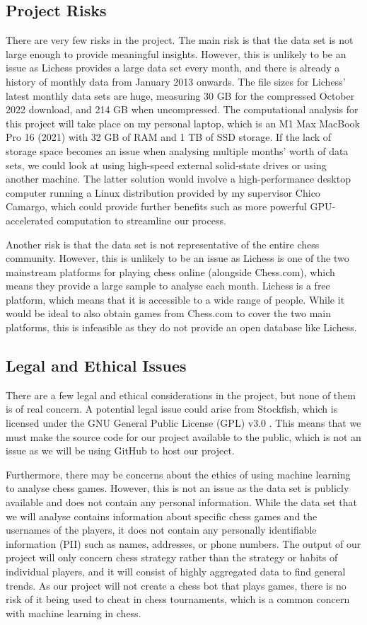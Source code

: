 \documentclass[%
 superscriptaddress,
showpacs,preprintnumbers,
 amsmath,
 amssymb,
 aps,
 pra,
showkeys,
onecolumn,
notitlepage,
11pt,
tightenlines      %
]{revtex4-1}
\begin{document}
\subsection{Project Risks}
There are very few risks in the project. The main risk is that the data set is not large enough to provide meaningful insights. However, this is unlikely to be an issue as Lichess provides a large data set every month, and there is already a history of monthly data from January 2013 onwards. The file sizes for Lichess' latest monthly data sets are huge, measuring 30 GB for the compressed October 2022 download, and 214 GB when uncompressed. The computational analysis for this project will take place on my personal laptop, which is an M1 Max MacBook Pro 16 (2021) with 32 GB of RAM and 1 TB of SSD storage. If the lack of storage space becomes an issue when analysing multiple months' worth of data sets, we could look at using high-speed external solid-state drives or using another machine. The latter solution would involve a high-performance desktop computer running a Linux distribution provided by my supervisor Chico Camargo, which could provide further benefits such as more powerful GPU-accelerated computation to streamline our process.

Another risk is that the data set is not representative of the entire chess community. However, this is unlikely to be an issue as Lichess is one of the two mainstream platforms for playing chess online (alongside Chess.com), which means they provide a large sample to analyse each month. Lichess is a free platform, which means that it is accessible to a wide range of people. While it would be ideal to also obtain games from Chess.com to cover the two main platforms, this is infeasible as they do not provide an open database like Lichess.

\subsection{Legal and Ethical Issues}
There are a few legal and ethical considerations in the project, but none of them is of real concern. A potential legal issue could arise from Stockfish, which is licensed under the GNU General Public License (GPL) v3.0 \cite{stockfishRepository}. This means that we must make the source code for our project available to the public, which is not an issue as we will be using GitHub to host our project.

Furthermore, there may be concerns about the ethics of using machine learning to analyse chess games. However, this is not an issue as the data set is publicly available and does not contain any personal information. While the data set that we will analyse contains information about specific chess games and the usernames of the players, it does not contain any personally identifiable information (PII) such as names, addresses, or phone numbers. The output of our project will only concern chess strategy rather than the strategy or habits of individual players, and it will consist of highly aggregated data to find general trends. As our project will not create a chess bot that plays games, there is no risk of it being used to cheat in chess tournaments, which is a common concern with machine learning in chess.
\end{document}
